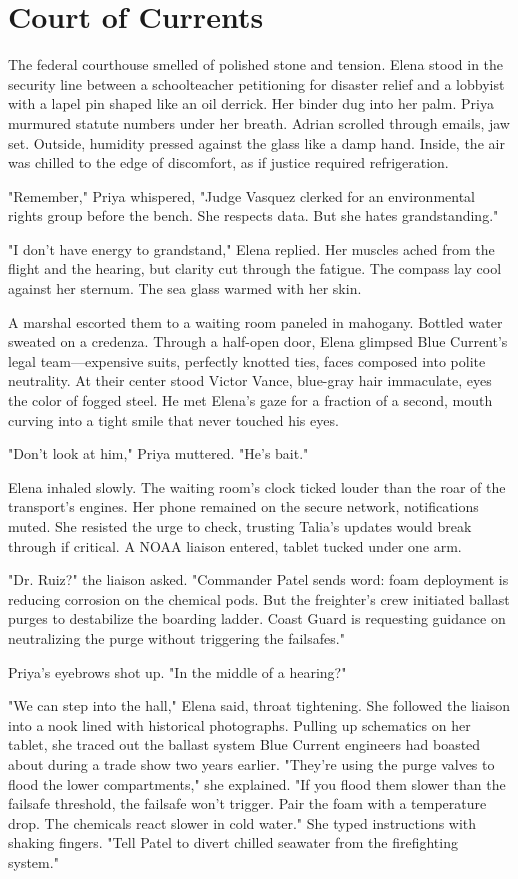 \chapter{Court of Currents}

The federal courthouse smelled of polished stone and tension. Elena stood in the security line between a schoolteacher petitioning for disaster relief and a lobbyist with a lapel pin shaped like an oil derrick. Her binder dug into her palm. Priya murmured statute numbers under her breath. Adrian scrolled through emails, jaw set. Outside, humidity pressed against the glass like a damp hand. Inside, the air was chilled to the edge of discomfort, as if justice required refrigeration.

"Remember," Priya whispered, "Judge Vasquez clerked for an environmental rights group before the bench. She respects data. But she hates grandstanding."

"I don't have energy to grandstand," Elena replied. Her muscles ached from the flight and the hearing, but clarity cut through the fatigue. The compass lay cool against her sternum. The sea glass warmed with her skin.

A marshal escorted them to a waiting room paneled in mahogany. Bottled water sweated on a credenza. Through a half-open door, Elena glimpsed Blue Current's legal team—expensive suits, perfectly knotted ties, faces composed into polite neutrality. At their center stood Victor Vance, blue-gray hair immaculate, eyes the color of fogged steel. He met Elena's gaze for a fraction of a second, mouth curving into a tight smile that never touched his eyes.

"Don't look at him," Priya muttered. "He's bait."

Elena inhaled slowly. The waiting room's clock ticked louder than the roar of the transport's engines. Her phone remained on the secure network, notifications muted. She resisted the urge to check, trusting Talia's updates would break through if critical. A NOAA liaison entered, tablet tucked under one arm.

"Dr. Ruiz?" the liaison asked. "Commander Patel sends word: foam deployment is reducing corrosion on the chemical pods. But the freighter's crew initiated ballast purges to destabilize the boarding ladder. Coast Guard is requesting guidance on neutralizing the purge without triggering the failsafes."

Priya's eyebrows shot up. "In the middle of a hearing?"

"We can step into the hall," Elena said, throat tightening. She followed the liaison into a nook lined with historical photographs. Pulling up schematics on her tablet, she traced out the ballast system Blue Current engineers had boasted about during a trade show two years earlier. "They're using the purge valves to flood the lower compartments," she explained. "If you flood them slower than the failsafe threshold, the failsafe won't trigger. Pair the foam with a temperature drop. The chemicals react slower in cold water." She typed instructions with shaking fingers. "Tell Patel to divert chilled seawater from the firefighting system."

